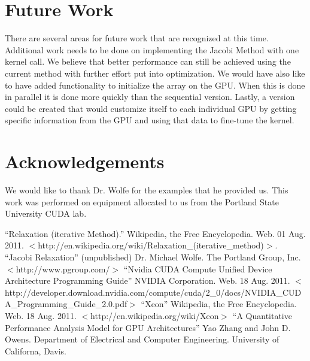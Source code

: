 \documentclass[10pt]{article}
\begin{document}
\begin{multicols}{2}
  \section{Future Work} %
  \label{sec:future_work}
  There are several areas for future work that are recognized at this time.
  Additional work needs to be done on implementing the Jacobi Method with one kernel call.
  We believe that better performance can still be achieved using the current method with further effort put into optimization.
  We would have also like to have added functionality to initialize the array on the GPU.
  When this is done in parallel it is done more quickly than the sequential version.
  Lastly, a version could be created that would customize itself to each individual GPU by getting specific information from the GPU and using that data to fine-tune the kernel.

  \section{Acknowledgements} %
  \label{sec:acknowledgements}
  We would like to thank Dr. Wolfe for the examples that he provided us.
  This work was performed on equipment allocated to us from the Portland State University CUDA lab.

\end{multicols}

\begin{flushleft}
  \begin{thebibliography}{99}
    ``Relaxation (iterative Method).''
      Wikipedia, the Free Encyclopedia. Web. 01 Aug. 2011. $<$http://en.wikipedia.org/wiki/Relaxation\_(iterative\_method)$>$.
    ``Jacobi Relaxation'' (unpublished)
      Dr. Michael Wolfe. The Portland Group, Inc. $<$http://www.pgroup.com/$>$
    ``Nvidia CUDA Compute Unified Device Architecture Programming Guide''
      NVIDIA Corporation. Web. 18 Aug. 2011. $<$http://developer.download.nvidia.com/compute/cuda/2\_0/docs/NVIDIA\_CUDA\_Programming\_Guide\_2.0.pdf$>$
    ``Xeon''
      Wikipedia, the Free Encyclopedia. Web. 18 Aug. 2011. $<$http://en.wikipedia.org/wiki/Xeon$>$
    ``A Quantitative Performance Analysis Model for GPU Architectures''
      Yao Zhang and John D. Owens. Department of Electrical and Computer Engineering. University of Californa, Davis.
  \end{thebibliography}
\end{flushleft}
\end{document}
